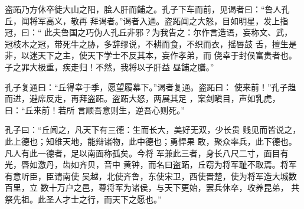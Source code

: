 \documentclass[12pt,UTF8]{ctexbook}
\begin{document}
盗跖乃方休卒徒大山之阳，脍人肝而餔之。孔子下车而前，见谒者曰：“鲁人孔丘，闻将军高义，敬再 拜谒者。”谒者入通。盗跖闻之大怒，目如明星，发上指冠，曰：“ 此夫鲁国之巧伪人孔丘非邪？为我告之：尔作言造语，妄称文、武， 冠枝木之冠，带死牛之胁，多辞缪说，不耕而食，不织而衣，摇唇鼓 舌，擅生是非，以迷天下之主，使天下学士不反其本，妄作孝弟，而 侥幸于封侯富贵者也。子之罪大极重，疾走归！不然，我将以子肝益 昼餔之膳。”

孔子复通曰：“丘得幸于季，愿望履幕下。”谒者复通。盗跖曰： 使来前！”孔子趋而进，避席反走，再拜盗跖。盗跖大怒，两展其足 ，案剑瞋目，声如乳虎，曰：“丘来前！若所 言顺吾意则生，逆吾心则死。”

孔子曰：“丘闻之，凡天下有三德：生而长大，美好无双，少长贵 贱见而皆说之，此上德也；知维天地，能辩诸物，此中德也；勇悍果 敢，聚众率兵，此下德也。凡人有此一德者，足以南面称孤矣。今将 军兼此三者，身长八尺二寸，面目有光，唇如激丹，齿如齐贝，音中 黄钟，而名曰盗跖，丘窃为将军耻不取焉。将军有意听臣，臣请南使 吴越，北使齐鲁，东使宋卫，西使晋楚，使为将军造大城数百里，立 数十万户之邑，尊将军为诸侯，与天下更始，罢兵休卒，收养昆弟， 共祭先祖。此圣人才士之行，而天下之愿也。”
\end{document}
